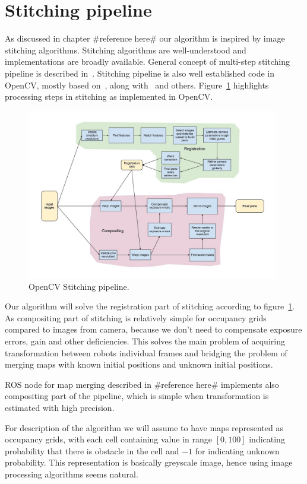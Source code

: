\section{Stitching pipeline} %
\label{sec:stitching_pipeline}

As discussed in chapter \#reference here\# our algorithm is inspired by image stitching algorithms. Stitching algorithms are well-understood and implementations are broadly available. General concept of multi-step stitching pipeline is described in~\cite{Brown2006}. Stitching pipeline is also well established code in \gls{OpenCV}, mostly based on~\cite{Brown2006}, along with~\cite{Szeliski2004} \cite{Shum1998} and others. Figure~\ref{fig:opencv} highlights processing steps in stitching as implemented in \gls{OpenCV}.

\begin{figure}
	\centering
	\includegraphics[width=4.33in]{../img/StitchingPipeline.jpg}
	\caption{\gls{OpenCV} Stitching pipeline.}
	\label{fig:opencv}
\end{figure}

Our algorithm will solve the registration part of stitching according to figure~\ref{fig:opencv}. As compositing part of stitching is relatively simple for occupancy grids compared to images from camera, because we don't need to compensate exposure errors, gain and other deficiencies. This solves the main problem of acquiring transformation between robots individual frames and bridging the problem of merging maps with known initial positions and unknown initial positions.

\gls{ROS} node for map merging described in \#reference here\# implements also compositing part of the pipeline, which is simple when transformation is estimated with high precision.

For description of the algorithm we will assume to have maps represented as occupancy grids, with each cell containing value in range $[0,100]$ indicating probability that there is obstacle in the cell and $-1$ for indicating unknown probability. This representation is basically greyscale image, hence using image processing algorithms seems natural.

